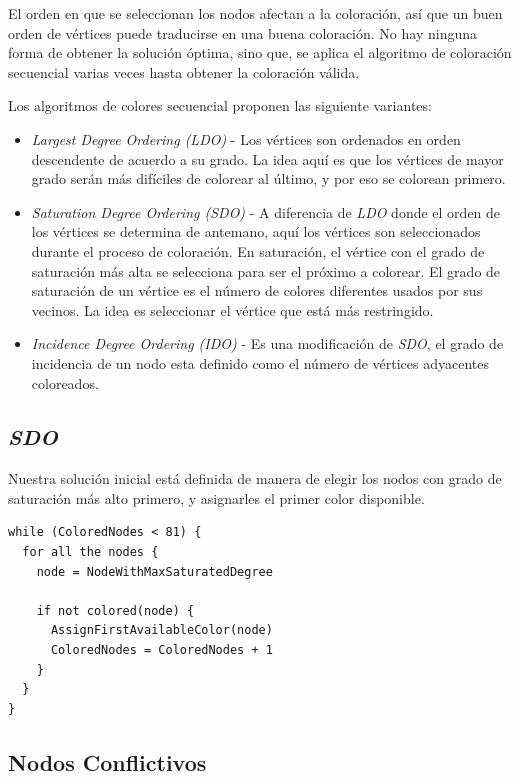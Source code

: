 \documentclass[a4paper,spanish]{article}
\begin{document}
El orden en que se seleccionan los nodos afectan a la coloración, así que un buen orden de
vértices puede traducirse en una buena coloración. No hay ninguna forma de obtener la solución óptima,
sino que, se aplica el algoritmo de coloración secuencial varias veces hasta obtener la coloración válida.

Los algoritmos de colores secuencial proponen las siguiente variantes:

\begin{itemize}
	\item \emph{Largest Degree Ordering (LDO)} - Los vértices son ordenados en orden descendente de acuerdo a su grado. La idea aquí  es que los vértices de mayor grado serán más difíciles de colorear al último, y por eso se colorean primero.
	\item \emph{Saturation Degree Ordering (SDO)} - A diferencia de \emph{LDO} donde el orden de los vértices se determina de antemano, aquí los vértices son seleccionados durante el proceso de coloración. En saturación, el vértice con el grado de saturación más alta se selecciona para ser el próximo a colorear. El grado de saturación de un vértice es el número de colores diferentes usados por sus vecinos. La idea es seleccionar el vértice que está más restringido.
	\item \emph{Incidence Degree Ordering (IDO)} - Es una modificación de \emph{SDO}, el grado de incidencia de un nodo esta definido como el número de vértices adyacentes coloreados.
\end{itemize}
 

\subsection{\emph{SDO}}

Nuestra solución inicial está definida de manera de elegir los nodos con
grado de saturación más alto primero, y asignarles el primer color disponible.

\begin{Verbatim}[samepage=true]
while (ColoredNodes < 81) {
  for all the nodes {
    node = NodeWithMaxSaturatedDegree

    if not colored(node) {
      AssignFirstAvailableColor(node)
      ColoredNodes = ColoredNodes + 1
    }
  }
}
\end{Verbatim}

\subsection{Nodos Conflictivos}
\end{document}
